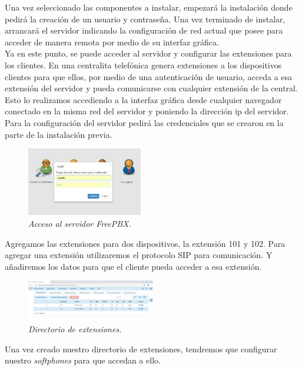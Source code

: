 \documentclass[conference]{IEEEtran}
\begin{document}
Una vez seleccionado las componentes a instalar, empezará la instalación donde pedirá la creación de un usuario y contraseña. Una vez terminado de instalar, arrancará el servidor indicando la configuración de red actual que posee para acceder de manera remota por medio de su interfaz gráfica.\\
Ya en este punto, se puede acceder al servidor y configurar las extensiones para los clientes. En una centralita telefónica genera extensiones a los dispositivos clientes para que ellos, por medio de una autenticación de usuario, acceda a esa extensión del servidor y pueda comunicarse con cualquier extensión de la central. Esto lo realizamos accediendo a la interfaz gráfica desde cualquier navegador conectado en la misma red del servidor y poniendo la dirección ip del servidor. Para la configuración del servidor pedirá las credenciales que se crearon en la parte de la instalación previa.
\begin{figure}
	\centerline{\includegraphics[width=0.45\textwidth]{img/8.jpeg}}
	\caption{\textit{Acceso al servidor FreePBX.}}
	\label{fig:mets2}
\end{figure}
Agregamos las extensiones para dos dispositivos, la extensión 101 y 102. Para agregar una extensión utilizaremos el protocolo SIP para comunicación. Y añadiremos los datos para que el cliente pueda acceder a esa extensión.
\begin{figure}
	\centerline{\includegraphics[width=0.5\textwidth]{img/mets04.jpeg}}
	\caption{\textit{Directorio de extensiones.}}
	\label{fig:mets4}
\end{figure}
Una vez creado nuestro directorio de extensiones, tendremos que configurar nuestro \textit{softphones} para que accedan a ello.
\end{document}
